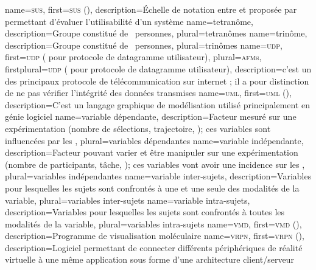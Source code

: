%
{%
	name={\textsc{sus}},%
	first={\textsc{sus} ()},%
	description={Échelle de notation entre  et  proposée par  permettant d'évaluer l'utilisabilité d'un système}%
}
%
{%
	name={tetranôme},%
	description={Groupe constitué de ~personnes},%
	plural={tetranômes}%
}
%
{%
	name={trinôme},%
	description={Groupe constitué de ~personnes},%
	plural={trinômes}%
}
%
{%
	name={\textsc{udp}},
	first={\textsc{udp} ( pour protocole de datagramme utilisateur)},%
	plural={\textsc{afm}s},%
	firstplural={\textsc{udp} ( pour protocole de datagramme utilisateur)},%
	description={c'est un des principaux protocole de télécommunication sur internet ; il a pour distinction de ne pas vérifier l'intégrité des données transmises}
}
%
{%
	name={\textsc{uml}},%
	first={\textsc{uml} ()},%
	description={C'est un langage graphique de modélisation utilisé principalement en génie logiciel}%
}
%
{%
	name={variable dépendante},%
	description={Facteur mesuré sur une expérimentation (nombre de sélections, trajectoire, \myetc); ces variables sont influencées par les },%
	plural={variables dépendantes}%
}
%
{%
	name={variable indépendante},%
	description={Facteur pouvant varier et être manipuler sur une expérimentation (nombre de participants, tâche, \myetc); ces variables vont avoir une incidence sur les },%
	plural={variables indépendantes}%
}
%
{%
	name={variable inter-sujets},%
	description={Variables pour lesquelles les sujets sont confrontés à une et une seule des modalités de la variable},%
	plural={variables inter-sujets}%
}
%
{%
	name={variable intra-sujets},%
	description={Variables pour lesquelles les sujets sont confrontés à toutes les modalités de la variable},%
	plural={variables intra-sujets}%
}
%
{%
	name={\textsc{vmd}},%
	first={\textsc{vmd} ()},%
	description={Programme de visualisation moléculaire }%
}
%
{%
	name={\textsc{vrpn}},%
	first={\textsc{vrpn} ()},%
	description={Logiciel permettant de connecter différents périphériques de réalité virtuelle à une même application sous forme d'une architecture client/serveur }%
}
